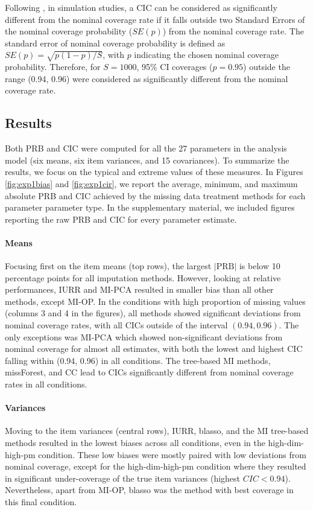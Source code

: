 	Following \cite{burtonEtAl:2006}, in simulation studies, a CIC can be considered as significantly different from the 
	nominal coverage rate if it falls outside two Standard Errors of the nominal coverage probability ($SE(p)$) from the 
	nominal coverage rate.
	The standard error of nominal coverage probability is defined as $SE(p) = \sqrt{p (1-p)/S}$, with $p$ indicating the
	chosen nominal coverage probability.
	Therefore, for $S = 1000$, 95\% CI coverages ($p = 0.95$) outside the range (0.94, 0.96) were considered as significantly 
	different from the nominal coverage rate.

\subsection{Results}
	
	Both PRB and CIC were computed for all the 27 parameters in the analysis model (six means, six item variances,
	and 15 covariances).
	To summarize the results, we focus on the typical and extreme values of these measures.
	In Figures \ref{fig:exp1bias} and \ref{fig:exp1cir}, we report the average, minimum, and maximum absolute PRB 
	and CIC achieved by the missing data treatment methods for each parameter parameter type.
	In the supplementary material, we included figures reporting the raw PRB and CIC for every parameter estimate.
%
	\paragraph{Means} 
	Focusing first on the item means (top rows), the largest $|\text{PRB}|$ is below 10 percentage points for all 
	imputation methods.
	However, looking at relative performances, IURR and MI-PCA resulted in smaller bias than all other methods, 
	except MI-OP.
	In the conditions with high proportion of missing values (columns 3 and 4 in the figures), all methods showed 
	significant deviations from nominal coverage rates, with all CICs outside of the interval $(0.94, 0.96)$.
	The only exceptions was MI-PCA which showed non-significant deviations from nominal coverage for 
	almost all estimates, with both the lowest and highest CIC falling within (0.94, 0.96) in all conditions.
	The tree-based MI methods, missForest, and CC lead to CICs significantly different from nominal coverage rates
	in all conditions.
%
	\paragraph{Variances} 
	Moving to the item variances (central rows), IURR, blasso, and the MI tree-based methods resulted in the lowest
	biases across all conditions, even in the high-dim-high-pm condition.
	These low biases were mostly paired with low deviations from nominal coverage, except for the high-dim-high-pm
	condition where they resulted in significant under-coverage of the true item 
	variances (highest $CIC < 0.94$).
	Nevertheless, apart from MI-OP, blasso was the method with best coverage in this final condition.
	
